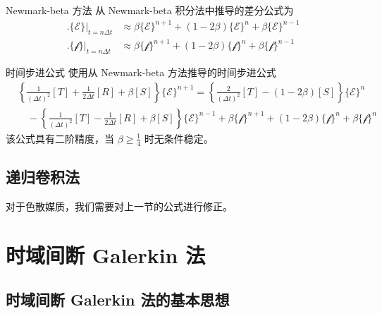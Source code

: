 \begin{theorem}{Newmark-beta 方法}
    从 Newmark-beta 积分法中推导的差分公式为
    \begin{align}
        \Big.\{\mathscr{E}\}\Big|_{t=n\Delta t}
        &\approx \beta\{\mathscr{E}\}^{n+1}
        +(1-2\beta)\{\mathscr{E}\}^{n}
        +\beta\{\mathscr{E}\}^{n-1}\\
        \Big.\{\mathscr{f}\}\Big|_{t=n\Delta t}
        &\approx \beta\{\mathscr{f}\}^{n+1}
        +(1-2\beta)\{\mathscr{f}\}^{n}
        +\beta\{\mathscr{f}\}^{n-1}
    \end{align}
\end{theorem}

\begin{theorem}{时间步进公式}
    使用从 Newmark-beta 方法推导的时间步进公式
    \begin{equation}
        \begin{aligned}
            &\left\{
                \frac{1}{(\Delta t)^2}[T]
                +\frac{1}{2\Delta t}[R]
                +\beta [S]
            \right\}\{\mathscr{E}\}^{n+1}
            =\left\{
                \frac{2}{(\Delta t)^2}[T]
                -(1-2\beta)[S]
            \right\}\{\mathscr{E}\}^n\\
            &\quad-\left\{
                \frac{1}{(\Delta t)^2}[T]
                -\frac{1}{2\Delta t}[R]
                +\beta [S]
            \right\}\{\mathscr{E}\}^{n-1}
            +\beta\{\mathscr{f}\}^{n+1}
            +(1-2\beta)\{\mathscr{f}\}^{n}
            +\beta\{\mathscr{f}\}^n
        \end{aligned}
    \end{equation}
    该公式具有二阶精度，当 $\beta\geq\frac{1}{4}$ 时无条件稳定。
\end{theorem}

\subsection{递归卷积法}

\par 对于色散媒质，我们需要对上一节的公式进行修正。

\section{时域间断 Galerkin 法}

\subsection{时域间断 Galerkin 法的基本思想}

